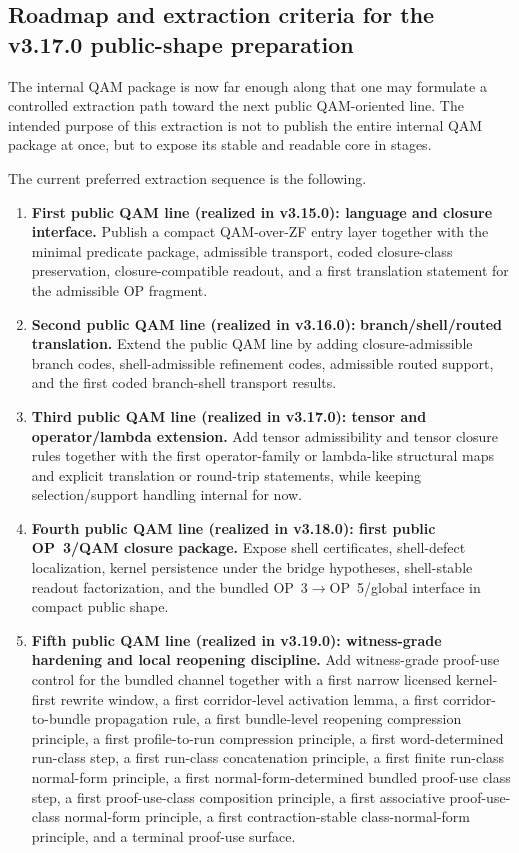 \subsection*{Roadmap and extraction criteria for the v3.17.0 public-shape preparation}
The internal QAM package is now far enough along that one may formulate a controlled extraction path toward the next public QAM-oriented line. The intended purpose of this extraction is not to publish the entire internal QAM package at once, but to expose its stable and readable core in stages.

The current preferred extraction sequence is the following.
\begin{enumerate}[leftmargin=2em]
  \item \textbf{First public QAM line (realized in v3.15.0): language and closure interface.} Publish a compact QAM-over-ZF entry layer together with the minimal predicate package, admissible transport, coded closure-class preservation, closure-compatible readout, and a first translation statement for the admissible OP fragment.
  \item \textbf{Second public QAM line (realized in v3.16.0):} \textbf{branch/shell/routed translation.} Extend the public QAM line by adding closure-admissible branch codes, shell-admissible refinement codes, admissible routed support, and the first coded branch-shell transport results.
  \item \textbf{Third public QAM line (realized in v3.17.0): tensor and operator/lambda extension.} Add tensor admissibility and tensor closure rules together with the first operator-family or lambda-like structural maps and explicit translation or round-trip statements, while keeping selection/support handling internal for now.
  \item \textbf{Fourth public QAM line (realized in v3.18.0): first public OP~3/QAM closure package.} Expose shell certificates, shell-defect localization, kernel persistence under the bridge hypotheses, shell-stable readout factorization, and the bundled OP~3$\to$OP~5/global interface in compact public shape.
  \item \textbf{Fifth public QAM line (realized in v3.19.0): witness-grade hardening and local reopening discipline.} Add witness-grade proof-use control for the bundled channel together with a first narrow licensed kernel-first rewrite window, a first corridor-level activation lemma, a first corridor-to-bundle propagation rule, a first bundle-level reopening compression principle, a first profile-to-run compression principle, a first word-determined run-class step, a first run-class concatenation principle, a first finite run-class normal-form principle, a first normal-form-determined bundled proof-use class step, a first proof-use-class composition principle, a first associative proof-use-class normal-form principle, a first contraction-stable class-normal-form principle, and a terminal proof-use surface.

\end{enumerate}
